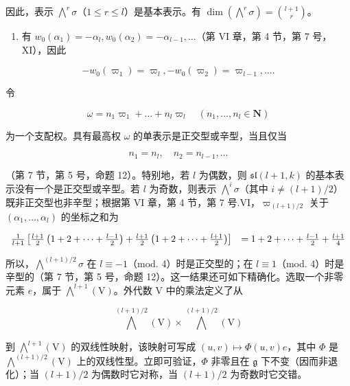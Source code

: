 因此，表示 \(\bigwedge^{r}\sigma\)（\(1 \leq r \leq l\)）是基本表示。有 \(\dim(\bigwedge^{r}\sigma) = \binom{l+1}{r}\)。

\begin{enumerate}
\def\labelenumi{(\Alph{enumi})}
\setcounter{enumi}{21}
\tightlist
\item
  有 \(w_0(\alpha_1) = -\alpha_l, w_0(\alpha_2) = -\alpha_{l-1}, \ldots\)（第 VI 章，第 4 节，第 7 号，XI），因此
\end{enumerate}

\[
- w _ {0} (\varpi_ {1}) = \varpi_ {l}, - w _ {0} (\varpi_ {2}) = \varpi_ {l - 1}, \ldots .
\]

令

\[
\omega = n _ {1} \varpi_ {1} + \dots + n _ {l} \varpi_ {l} \quad (n _ {1}, \ldots , n _ {l} \in \mathbf {N})
\]

为一个支配权。具有最高权 \(\omega\) 的单表示是正交型或辛型，当且仅当

\[
n _ {1} = n _ {l}, \quad n _ {2} = n _ {l - 1}, \ldots
\]

（第 7 节，第 5 号，命题 12）。特别地，若 \(l\) 为偶数，则 \(\mathfrak{sl}(l + 1,k)\) 的基本表示没有一个是正交型或辛型。若 \(l\) 为奇数，则表示 \(\bigwedge^i\sigma\)（其中 \(i\neq (l + 1) / 2\)）既非正交型也非辛型；根据第 VI 章，第 4 节，第 7 号.VI，\(\varpi_{(l + 1) / 2}\) 关于 \((\alpha_{1},\ldots ,\alpha_{l})\) 的坐标之和为

\[
\begin{array}{r l} \frac {1}{l + 1} \left[ \frac {l + 1}{2} \left(1 + 2 + \dots + \frac {l - 1}{2}\right) + \frac {l + 1}{2} \left(1 + 2 + \dots + \frac {l + 1}{2}\right) \right] & = 1 + 2 + \dots + \frac {l - 1}{2} + \frac {l + 1}{4} \end{array}
\]

所以，\(\bigwedge^{(l + 1) / 2}\sigma\) 在 \(l\equiv -1\)（mod. 4）时是正交型的；在 \(l\equiv 1\)（mod. 4）时是辛型的（第 7 节，第 5 号，命题 12）。这一结果还可如下精确化。选取一个非零元素 \(e\)，属于 \(\bigwedge^{l + 1}(\mathrm{V})\)。外代数 \(\mathrm{V}\) 中的乘法定义了从

\[
\bigwedge^ {(l + 1) / 2} (\mathrm{V}) \times \bigwedge^ {(l + 1) / 2} (\mathrm{V})
\]

到 \(\bigwedge^{l + 1}(\mathrm{V})\) 的双线性映射，该映射可写成 \((u,v)\mapsto \varPhi (u,v)e\)，其中 \(\varPhi\) 是 \(\bigwedge^{(l + 1) / 2}(\mathrm{V})\) 上的双线性型。立即可验证，\(\varPhi\) 非零且在 \(\mathfrak{g}\) 下不变（因而非退化）；当 \((l + 1) / 2\) 为偶数时它对称，当 \((l + 1) / 2\) 为奇数时它交错。

